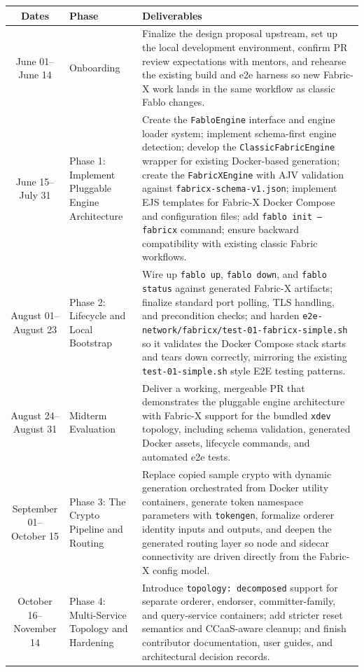 \begin{table}[h]
\centering
\begin{tabularx}{\textwidth}{|c|p{3.2cm}|X|}
\hline
\textbf{Dates} & \textbf{Phase} & \textbf{Deliverables} \\
\hline
June 01--June 14 & Onboarding & Finalize the design proposal upstream, set up the local development environment, confirm PR review expectations with mentors, and rehearse the existing build and e2e harness so new Fabric-X work lands in the same workflow as classic Fablo changes. \\
\hline
June 15--July 31 & Phase 1: Implement Pluggable Engine Architecture & Create the \texttt{FabloEngine} interface and engine loader system; implement schema-first engine detection; develop the \texttt{ClassicFabricEngine} wrapper for existing Docker-based generation; create the \texttt{FabricXEngine} with AJV validation against \texttt{fabricx-schema-v1.json}; implement EJS templates for Fabric-X Docker Compose and configuration files; add \texttt{fablo init --fabricx} command; ensure backward compatibility with existing classic Fabric workflows. \\
\hline
August 01--August 23 & Phase 2: Lifecycle and Local Bootstrap & Wire up \texttt{fablo up}, \texttt{fablo down}, and \texttt{fablo status} against generated Fabric-X artifacts; finalize standard port polling, TLS handling, and precondition checks; and harden \texttt{e2e-network/fabricx/test-01-fabricx-simple.sh} so it validates the Docker Compose stack starts and tears down correctly, mirroring the existing \texttt{test-01-simple.sh} style E2E testing patterns. \\
\hline
August 24--August 31 & Midterm Evaluation & Deliver a working, mergeable PR that demonstrates the pluggable engine architecture with Fabric-X support for the bundled \texttt{xdev} topology, including schema validation, generated Docker assets, lifecycle commands, and automated e2e tests. \\
\hline
September 01--October 15 & Phase 3: The Crypto Pipeline and Routing & Replace copied sample crypto with dynamic generation orchestrated from Docker utility containers, generate token namespace parameters with \texttt{tokengen}, formalize orderer identity inputs and outputs, and deepen the generated routing layer so node and sidecar connectivity are driven directly from the Fabric-X config model. \\
\hline
October 16--November 14 & Phase 4: Multi-Service Topology and Hardening & Introduce \texttt{topology: decomposed} support for separate orderer, endorser, committer-family, and query-service containers; add stricter reset semantics and CCaaS-aware cleanup; and finish contributor documentation, user guides, and architectural decision records. \\

\end{tabularx}
\end{table}

